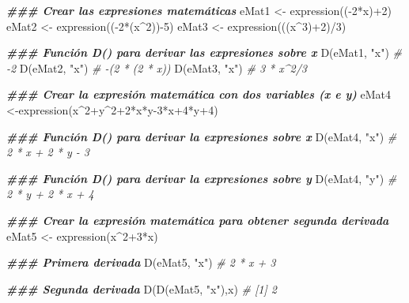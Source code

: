\documentclass[
]{article}
\newenvironment{Shaded}{\begin{snugshade}}{\end{snugshade}}
\newcommand{\CommentTok}[1]{\textcolor[rgb]{0.56,0.35,0.01}{\textit{#1}}}
\newcommand{\DecValTok}[1]{\textcolor[rgb]{0.00,0.00,0.81}{#1}}
\newcommand{\DocumentationTok}[1]{\textcolor[rgb]{0.56,0.35,0.01}{\textbf{\textit{#1}}}}
\newcommand{\FunctionTok}[1]{\textcolor[rgb]{0.00,0.00,0.00}{#1}}
\newcommand{\NormalTok}[1]{#1}
\newcommand{\OtherTok}[1]{\textcolor[rgb]{0.56,0.35,0.01}{#1}}
\newcommand{\SpecialCharTok}[1]{\textcolor[rgb]{0.00,0.00,0.00}{#1}}
\newcommand{\StringTok}[1]{\textcolor[rgb]{0.31,0.60,0.02}{#1}}
\theoremstyle{definition}
\theoremstyle{definition}
\theoremstyle{definition}
\theoremstyle{definition}
\theoremstyle{remark}
\begin{document}
\begin{Shaded}
\begin{Highlighting}[]
\DocumentationTok{\#\#\# Crear las expresiones matemáticas}
\NormalTok{eMat1 }\OtherTok{\textless{}{-}} \FunctionTok{expression}\NormalTok{((}\SpecialCharTok{{-}}\DecValTok{2}\SpecialCharTok{*}\NormalTok{x)}\SpecialCharTok{+}\DecValTok{2}\NormalTok{)}
\NormalTok{eMat2 }\OtherTok{\textless{}{-}} \FunctionTok{expression}\NormalTok{((}\SpecialCharTok{{-}}\DecValTok{2}\SpecialCharTok{*}\NormalTok{(x}\SpecialCharTok{\^{}}\DecValTok{2}\NormalTok{))}\SpecialCharTok{{-}}\DecValTok{5}\NormalTok{)}
\NormalTok{eMat3 }\OtherTok{\textless{}{-}} \FunctionTok{expression}\NormalTok{(((x}\SpecialCharTok{\^{}}\DecValTok{3}\NormalTok{)}\SpecialCharTok{+}\DecValTok{2}\NormalTok{)}\SpecialCharTok{/}\DecValTok{3}\NormalTok{)}

\DocumentationTok{\#\#\# Función D() para derivar las expresiones sobre x}
\FunctionTok{D}\NormalTok{(eMat1, }\StringTok{"x"}\NormalTok{)}
\CommentTok{\# {-}2}
\FunctionTok{D}\NormalTok{(eMat2, }\StringTok{"x"}\NormalTok{)}
\CommentTok{\# {-}(2 * (2 * x))}
\FunctionTok{D}\NormalTok{(eMat3, }\StringTok{"x"}\NormalTok{)}
\CommentTok{\# 3 * x\^{}2/3}

\DocumentationTok{\#\#\# Crear la expresión matemática con dos variables (x e y)}
\NormalTok{eMat4 }\OtherTok{\textless{}{-}}\FunctionTok{expression}\NormalTok{(x}\SpecialCharTok{\^{}}\DecValTok{2}\SpecialCharTok{+}\NormalTok{y}\SpecialCharTok{\^{}}\DecValTok{2}\SpecialCharTok{+}\DecValTok{2}\SpecialCharTok{*}\NormalTok{x}\SpecialCharTok{*}\NormalTok{y}\DecValTok{{-}3}\SpecialCharTok{*}\NormalTok{x}\SpecialCharTok{+}\DecValTok{4}\SpecialCharTok{*}\NormalTok{y}\SpecialCharTok{+}\DecValTok{4}\NormalTok{)}

\DocumentationTok{\#\#\# Función D() para derivar la expresiones sobre x}
\FunctionTok{D}\NormalTok{(eMat4, }\StringTok{"x"}\NormalTok{)}
\CommentTok{\# 2 * x + 2 * y {-} 3}

\DocumentationTok{\#\#\# Función D() para derivar la expresiones sobre y}
\FunctionTok{D}\NormalTok{(eMat4, }\StringTok{"y"}\NormalTok{)}
\CommentTok{\# 2 * y + 2 * x + 4}

\DocumentationTok{\#\#\# Crear la expresión matemática para obtener segunda derivada}
\NormalTok{eMat5 }\OtherTok{\textless{}{-}} \FunctionTok{expression}\NormalTok{(x}\SpecialCharTok{\^{}}\DecValTok{2}\SpecialCharTok{+}\DecValTok{3}\SpecialCharTok{*}\NormalTok{x)}

\DocumentationTok{\#\#\# Primera derivada}
\FunctionTok{D}\NormalTok{(eMat5, }\StringTok{"x"}\NormalTok{)}
\CommentTok{\# 2 * x + 3}
  
\DocumentationTok{\#\#\# Segunda derivada}
\FunctionTok{D}\NormalTok{(}\FunctionTok{D}\NormalTok{(eMat5, }\StringTok{"x"}\NormalTok{),}\StringTok{\textquotesingle{}x\textquotesingle{}}\NormalTok{)}
\CommentTok{\# [1] 2}
\end{Highlighting}
\end{Shaded}
\end{document}
